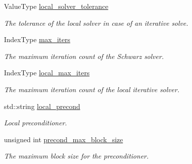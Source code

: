 \begin{DoxyCompactItemize}
Value\+Type \hyperlink{structschwz_1_1Metadata_a0fec5924fa99f07cabf560cc461887b5}{local\+\_\+solver\+\_\+tolerance}
\begin{DoxyCompactList}\small\item\em The tolerance of the local solver in case of an iterative solve. \end{DoxyCompactList}\item 
\mbox{\label{structschwz_1_1Metadata_aa3fbf70891e008cf810b6480be6607da}} 
Index\+Type \hyperlink{structschwz_1_1Metadata_aa3fbf70891e008cf810b6480be6607da}{max\+\_\+iters}
\begin{DoxyCompactList}\small\item\em The maximum iteration count of the Schwarz solver. \end{DoxyCompactList}\item 
\mbox{\label{structschwz_1_1Metadata_a54d674e16789df0e5c226ec669d0c6e4}} 
Index\+Type \hyperlink{structschwz_1_1Metadata_a54d674e16789df0e5c226ec669d0c6e4}{local\+\_\+max\+\_\+iters}
\begin{DoxyCompactList}\small\item\em The maximum iteration count of the local iterative solver. \end{DoxyCompactList}\item 
\mbox{\label{structschwz_1_1Metadata_a4ea47eff6a067a4a166d4236a75efe30}} 
std\+::string \hyperlink{structschwz_1_1Metadata_a4ea47eff6a067a4a166d4236a75efe30}{local\+\_\+precond}
\begin{DoxyCompactList}\small\item\em Local preconditioner. \end{DoxyCompactList}\item 
\mbox{\label{structschwz_1_1Metadata_a93978e9e4d28fac4ee80fdb5c77a7074}} 
unsigned int \hyperlink{structschwz_1_1Metadata_a93978e9e4d28fac4ee80fdb5c77a7074}{precond\+\_\+max\+\_\+block\+\_\+size}
\begin{DoxyCompactList}\small\item\em The maximum block size for the preconditioner. \end{DoxyCompactList}\item 
\mbox{\label{structschwz_1_1Metadata_a3436901bfcd4f17f65ed3acb810a7909}} 

\end{DoxyCompactItemize}
